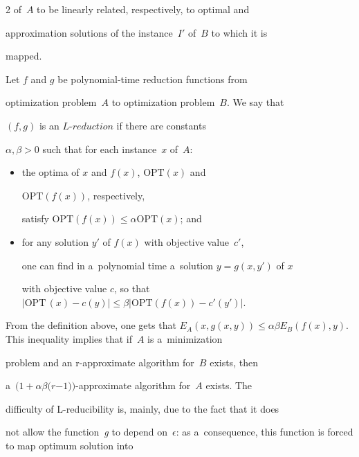 \begin{multicols}{2}
of~$A$ to be linearly related, respectively, to optimal and


approximation solutions of the instance~$I'$ of~$B$ to which it is


mapped.





Let $f$ and $g$ be polynomial-time reduction functions from


optimization problem~$A$ to optimization problem~$B$. We say that


$(f,g)$ is an $\textit{L-reduction}$ if there are constants


$\alpha,\beta > 0$ such that for each instance~$x$ of~$A$:


\begin{itemize}


\item the optima of $x$ and $f(x)$, $\mathrm{OPT}\left(x\right)$ and


$\mathrm{OPT}\left(f(x)\right)$, respectively,


satisfy $\mathrm{OPT}\left(f(x)\right) \leq \alpha \mathrm{OPT}\left(x\right)$; and


\item for any solution $y'$ of $f(x)$ with objective value~$c'$,


one can find in a~polynomial time a~solution $y = g(x,y')$ of $x$


with objective value $c$, so that $|\mathrm{OPT}\,(x)-c(y)| \leq


\beta |\mathrm{OPT}\left(f(x)\right)-c'(y')|$.


\end{itemize}





From the definition above, one gets that $E_A(x,g(x,y))\leq \alpha\beta


E_B(f(x),y)$. This inequality implies that if~$A$ is a~minimization


problem and an \mbox{r-approximate} algorithm for~$B$ exists, then


a~$(1+\alpha\beta (r$\linebreak $-1))$-approximate algorithm for~$A$ exists. The


difficulty of L-reducibility is, mainly, due to the fact that it does


not allow the function~\textit{g} to depend on~$\epsilon$: as a~consequence, this function is forced to map optimum solution into



\end{multicols}

